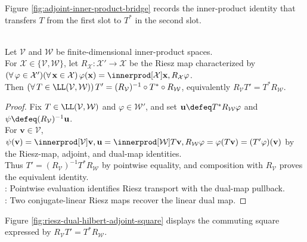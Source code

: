 Figure \ref{fig:adjoint-inner-product-bridge} records the inner-product identity that transfers $T$ from the first slot to $T^*$ in the second slot.
\begin{illustrationfigure}[H]
  \centering
  
  \caption{Adjoint relation: $\innerprod[\mathcal{W}]{T\mathbf{v},\mathbf{w}}=\innerprod[\mathcal{V}]{\mathbf{v},T^*\mathbf{w}}$.}
  \label{fig:adjoint-inner-product-bridge}
\end{illustrationfigure}

\begin{proposition} \label{prop:riesz-transport-dual-adjoint} \\
Let $\mathcal{V}$ and $\mathcal{W}$ be finite-dimensional inner-product spaces.\\
For $\mathcal{X}\in\{\mathcal{V},\mathcal{W}\}$, let $R_{\mathcal{X}}:\mathcal{X}'\to\mathcal{X}$ be the Riesz map characterized by $(\forall\,\varphi\in\mathcal{X}')(\forall\,\mathbf{x}\in\mathcal{X})\,\varphi(\mathbf{x})=\innerprod[\mathcal{X}]{\mathbf{x},R_{\mathcal{X}}\varphi}$.\\
Then $(\forall\,T\in\LL(\mathcal{V},\mathcal{W}))\,T'=(R_{\mathcal{V}})^{-1}\circ T^*\circ R_{\mathcal{W}}$, equivalently $R_{\mathcal{V}}T'=T^*R_{\mathcal{W}}$.
\begin{proof}
Fix $T\in\LL(\mathcal{V},\mathcal{W})$ and $\varphi\in\mathcal{W}'$, and set $\mathbf{u}\defeq T^*R_{\mathcal{W}}\varphi$ and $\psi\defeq(R_{\mathcal{V}})^{-1}\mathbf{u}$.\\
For $\mathbf{v}\in\mathcal{V}$, $\psi(\mathbf{v})=\innerprod[\mathcal{V}]{\mathbf{v},\mathbf{u}}=\innerprod[\mathcal{W}]{T\mathbf{v},R_{\mathcal{W}}\varphi}=\varphi(T\mathbf{v})=(T'\varphi)(\mathbf{v})$ by the Riesz-map, adjoint, and dual-map identities.\\
Thus $T'=(R_{\mathcal{V}})^{-1}T^*R_{\mathcal{W}}$ by pointwise equality, and composition with $R_{\mathcal{V}}$ proves the equivalent identity.\\
: Pointwise evaluation identifies Riesz transport with the dual-map pullback.\\
: Two conjugate-linear Riesz maps recover the linear dual map.
\end{proof}
\end{proposition}

Figure \ref{fig:riesz-dual-hilbert-adjoint-square} displays the commuting square expressed by $R_{\mathcal{V}}T'=T^*R_{\mathcal{W}}$.
\begin{illustrationfigure}[H]
  \centering
  
  \caption{Riesz transports the dual map to the adjoint: $R_{\mathcal{V}}T'=T^*R_{\mathcal{W}}$.}
  \label{fig:riesz-dual-hilbert-adjoint-square}
\end{illustrationfigure}

